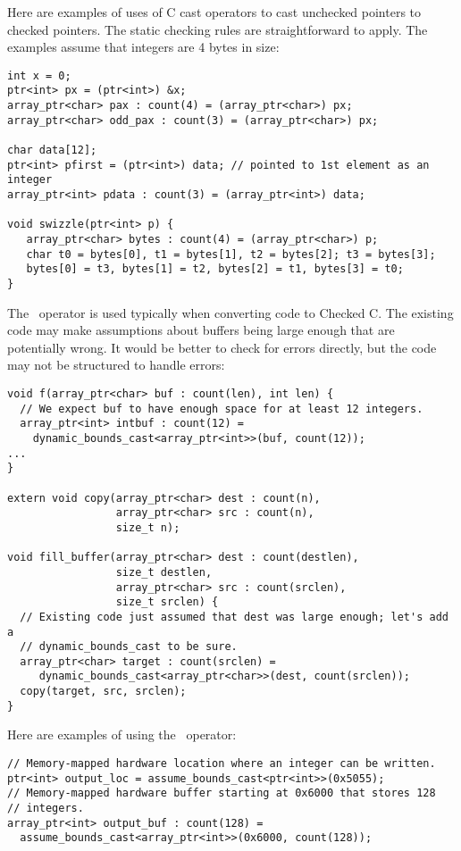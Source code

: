 Here are examples of uses of C cast operators to cast unchecked
pointers to checked pointers.  The static checking rules are straightforward
to apply.  The examples assume that integers are
4 bytes in size:
\begin{lstlisting}
int x = 0;
ptr<int> px = (ptr<int>) &x;
array_ptr<char> pax : count(4) = (array_ptr<char>) px;
array_ptr<char> odd_pax : count(3) = (array_ptr<char>) px;

char data[12];
ptr<int> pfirst = (ptr<int>) data; // pointed to 1st element as an integer
array_ptr<int> pdata : count(3) = (array_ptr<int>) data;

void swizzle(ptr<int> p) {
   array_ptr<char> bytes : count(4) = (array_ptr<char>) p;
   char t0 = bytes[0], t1 = bytes[1], t2 = bytes[2]; t3 = bytes[3];
   bytes[0] = t3, bytes[1] = t2, bytes[2] = t1, bytes[3] = t0;
}
\end{lstlisting}
The \dynamicboundscast\ operator is used typically when converting
code to Checked C.  The existing code may make assumptions
about buffers being large enough that are potentially wrong.
It would be better to check for errors directly, but the code may not
be structured to handle errors:
\begin{lstlisting}
void f(array_ptr<char> buf : count(len), int len) {
  // We expect buf to have enough space for at least 12 integers.
  array_ptr<int> intbuf : count(12) =
    dynamic_bounds_cast<array_ptr<int>>(buf, count(12));
...
}

extern void copy(array_ptr<char> dest : count(n),
                 array_ptr<char> src : count(n),
                 size_t n);

void fill_buffer(array_ptr<char> dest : count(destlen),
                 size_t destlen,
                 array_ptr<char> src : count(srclen),
                 size_t srclen) {
  // Existing code just assumed that dest was large enough; let's add a
  // dynamic_bounds_cast to be sure.
  array_ptr<char> target : count(srclen) =
     dynamic_bounds_cast<array_ptr<char>>(dest, count(srclen));
  copy(target, src, srclen);
}
\end{lstlisting}
Here are examples of using the \assumeboundscast\ operator:
\begin{lstlisting}
// Memory-mapped hardware location where an integer can be written.
ptr<int> output_loc = assume_bounds_cast<ptr<int>>(0x5055);
// Memory-mapped hardware buffer starting at 0x6000 that stores 128
// integers.
array_ptr<int> output_buf : count(128) =
  assume_bounds_cast<array_ptr<int>>(0x6000, count(128));
\end{lstlisting}
